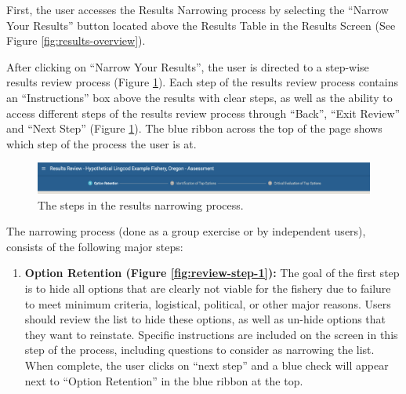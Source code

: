 \documentclass[
  11pt,
]{book}
\providecommand{\tightlist}{%
  \setlength{\itemsep}{0pt}\setlength{\parskip}{0pt}}
\begin{document}
First, the user accesses the Results Narrowing process by selecting the ``Narrow Your Results'' button located above the Results Table in the Results Screen (See Figure \ref{fig:results-overview}).

After clicking on ``Narrow Your Results'', the user is directed to a step-wise results review process (Figure \ref{fig:results-review-header}). Each step of the results review process contains an ``Instructions'' box above the results with clear steps, as well as the ability to access different steps of the results review process through ``Back'', ``Exit Review'' and ``Next Step'' (Figure \ref{fig:results-review-header}). The blue ribbon across the top of the page shows which step of the process the user is at.

\begin{figure}

{\centering \includegraphics[width=0.95\linewidth]{images/results-review-header} 

}

\caption{The steps in the results narrowing process.}\label{fig:results-review-header}
\end{figure}

The narrowing process (done as a group exercise or by independent users), consists of the following major steps:

\begin{enumerate}
\def\labelenumi{\arabic{enumi}.}
\tightlist
\item
  \textbf{Option Retention (Figure \ref{fig:review-step-1}):} The goal of the first step is to hide all options that are clearly not viable for the fishery due to failure to meet minimum criteria, logistical, political, or other major reasons. Users should review the list to hide these options, as well as un-hide options that they want to reinstate. Specific instructions are included on the screen in this step of the process, including questions to consider as narrowing the list. When complete, the user clicks on ``next step'' and a blue check will appear next to ``Option Retention'' in the blue ribbon at the top.
\end{enumerate}
\end{document}
